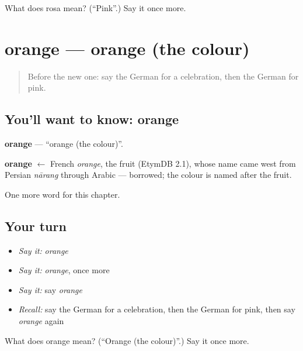 \begin{tcolorbox}[breakable,colback=teal!4,colframe=teal!35!black,title={Before you move on}]
What does rosa mean? (\textquotedblleft{}Pink\textquotedblright{}.) Say it once more.
\end{tcolorbox}
\section[orange]{orange — orange (the colour)}

\label{lesson:GE-C130-orange}



\begin{quote}
Before the new one: say the German for a celebration, then the German for pink.
\end{quote}

\subsection*{You'll want to know: orange}
\textbf{orange} — \textquotedblleft{}orange (the colour)\textquotedblright{}.

\begin{cousinweb}
\textbf{orange} $\leftarrow$ French \emph{orange}, the fruit (EtymDB 2.1), whose name came west from Persian \emph{nārang} through Arabic — borrowed; the colour is named after the fruit.
\end{cousinweb}

\begin{grammarlens}[title={What you've built}]
One more word for this chapter.
\end{grammarlens}

\subsection*{Your turn}
\begin{itemize}
\raggedright
  \item \emph{Say it:} \emph{orange}
  \item \emph{Say it:} \emph{orange}, once more
  \item \emph{Say it:} say \emph{orange}
  \item \emph{Recall:} say the German for a celebration, then the German for pink, then say \emph{orange} again
\end{itemize}

\begin{tcolorbox}[breakable,colback=teal!4,colframe=teal!35!black,title={Before you move on}]
What does orange mean? (\textquotedblleft{}Orange (the colour)\textquotedblright{}.) Say it once more.
\end{tcolorbox}

